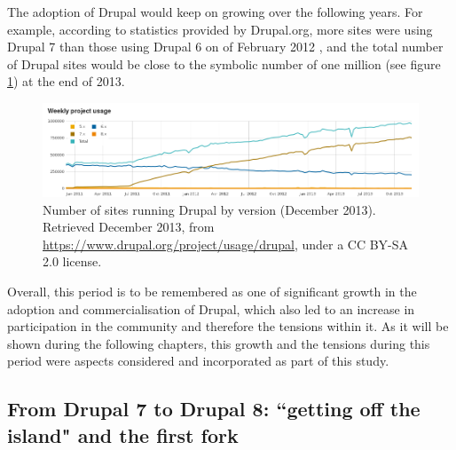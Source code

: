 The adoption of Drupal would keep on growing over the following years. For example, according to statistics provided by Drupal.org, more sites were using Drupal 7  than those using Drupal 6 on  of February 2012 \parencite{drupal-core-stats:Online}, and the total number of Drupal sites would be close to the symbolic number of one million (see figure \ref{stats-drupal-core}) at the end of 2013.

\begin{figure}[H]
	\centering
	\includegraphics[scale=0.43]{img/stats_drupal_core.png}
	\caption[Number of sites running Drupal (2011-2013)]%
	{Number of sites running Drupal by version (December 2013). Retrieved  December 2013, from \url{https://www.drupal.org/project/usage/drupal}, under a CC BY-SA 2.0 license.}
	\label{stats-drupal-core}
\end{figure}

Overall, this period is to be remembered as one of significant growth in the adoption and commercialisation of Drupal, which also led to an increase in participation in the community and therefore the tensions within it. As it will be shown during the following chapters, this growth and the tensions during this period were aspects considered and incorporated as part of this study.

\subsection{From Drupal 7 to Drupal 8: ``getting off the island" and the first fork}
\label{subsec:d7-d8}


